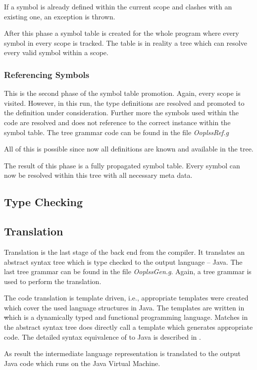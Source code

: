 If a symbol is already defined within the current scope and clashes with
an existing one, an exception is thrown.

After this phase a symbol table is created for the whole program where
every symbol in every scope is tracked. The table is in reality a tree
which can resolve every valid symbol within a scope.

\subsubsection{Referencing Symbols}
This is the second phase of the symbol table promotion. Again, every scope
is visited. However, in this run, the type definitions are resolved and
promoted to the definition under consideration. Further more the symbols
used within the code are resolved and does not reference to the correct
instance within the symbol table. The tree grammar code can be found in
the file \emph{OoplssRef.g}

All of this is possible since now all definitions are known and available
in the tree.

The result of this phase is a fully propagated symbol table. Every symbol can
now be resolved within this tree with all necessary meta data.

\subsection{Type Checking}

\subsection{Translation}
Translation is the last stage of the back end from the compiler. It
translates an abstract syntax tree which is type checked to the
output language -- Java. The last tree grammar can be found in the
file \emph{OoplssGen.g}. Again, a tree grammar is used to perform the
translation.

The code translation is template driven, i.e., appropriate templates
were created which cover the used language structures in Java. The
templates are written in \st which is a dynamically typed and functional
programming language. Matches in the abstract syntax tree does directly
call a template which generates appropriate code. The detailed syntax
equivalence of \ooplss to Java is described in .

As result the intermediate language representation is translated to the
output Java code which runs on the Java Virtual Machine.

